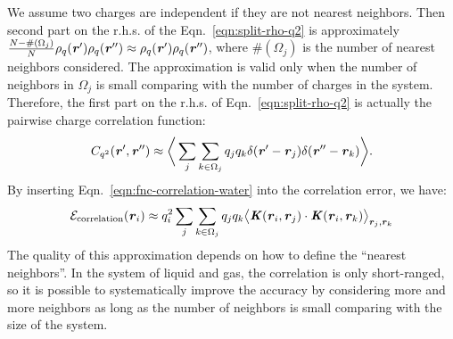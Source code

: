 \documentclass[aps,pre,preprint,unsortedaddress]{revtex4}
\renewcommand{\v}[1]{\textbf{\textit{#1}}}
\begin{document}
We assume two charges are independent if they are not nearest neighbors.
Then
second part on the r.h.s. of the Eqn.~\eqref{eqn:split-rho-q2} is
approximately $\frac{N-\#(\Omega_j)}{N}\rho_q(\v r')\rho_q(\v r'')\approx
\rho_q(\v r')\rho_q(\v r'')$,
where $\#(\Omega_j)$ is the number of nearest neighbors considered.
The approximation is valid only when the number
of neighbors in $\Omega_j$ is small comparing with the number of charges
in the system.
Therefore, the first part
on the r.h.s. of Eqn.~\eqref{eqn:split-rho-q2} is actually the
pairwise charge correlation function:
\begin{align}\label{eqn:fnc-correlation-water}
  C_{q^2}(\v r', \v r'') \approx
  \bigg\langle
  \sum_j\sum_{k\in\Omega_j}q_jq_k\delta(\v r' - \v r_j)\delta(\v r'' - \v r_k)
  \bigg\rangle.
\end{align}
By inserting Eqn.~\eqref{eqn:fnc-correlation-water} into
the correlation error, we have:
\begin{align}
  \mathcal E_{\textrm{correlation}}(\v r_i)
  \approx q_i^2\sum_j\sum_{k\in\Omega_j}q_jq_k
  \big\langle
  \v K(\v r_i , \v r_j)\cdot\v K(\v r_i , \v r_k)
  \big\rangle_{\v r_j,\v r_k}
\end{align}
The quality of this approximation depends on how to define the
``nearest neighbors''. In the system of liquid and gas, the
correlation is only short-ranged, so it is possible to systematically
improve the accuracy by considering more and more neighbors as long as
the number of neighbors is small comparing with the size of the system.
\end{document}
